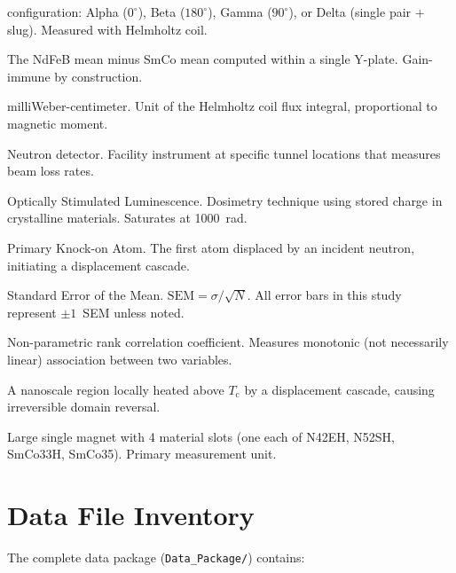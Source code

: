 \documentclass[11pt,letterpaper]{article}
\newcommand{\Tc}{T_\mathrm{c}}
\begin{document}
\begin{appendices}
\begin{description}
    configuration: Alpha ($0^\circ$), Beta ($180^\circ$), Gamma ($90^\circ$),
    or Delta (single pair + slug). Measured with Helmholtz coil.
    \item[Intra-plate differential] The NdFeB mean minus SmCo mean computed
    within a single Y-plate. Gain-immune by construction.
    \item[mWC] milliWeber-centimeter. Unit of the Helmholtz coil flux integral,
    proportional to magnetic moment.
    \item[NDX] Neutron detector. Facility instrument at specific tunnel
    locations that measures beam loss rates.
    \item[OSL] Optically Stimulated Luminescence. Dosimetry technique using
    stored charge in crystalline materials. Saturates at \SI{1000}{rad}.
    \item[PKA] Primary Knock-on Atom. The first atom displaced by an incident
    neutron, initiating a displacement cascade.
    \item[SEM] Standard Error of the Mean. $\mathrm{SEM} = \sigma / \sqrt{N}$.
    All error bars in this study represent $\pm 1$~SEM unless noted.
    \item[Spearman $\rho$] Non-parametric rank correlation coefficient.
    Measures monotonic (not necessarily linear) association between two
    variables.
    \item[Thermal spike] A nanoscale region locally heated above $\Tc$ by a
    displacement cascade, causing irreversible domain reversal.
    \item[Y-plate] Large single magnet with 4 material slots (one each of
    N42EH, N52SH, SmCo33H, SmCo35). Primary measurement unit.
\end{description}

\section{Data File Inventory}
\label{app:data_files}

The complete data package (\texttt{Data\_Package/}) contains:


\end{appendices}
\end{document}
